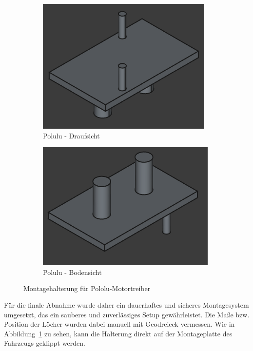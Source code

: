 \begin{figure}[h]
    \centering

    \begin{subfigure}[b]{0.25\textwidth}
        \centering
        \includegraphics[width=\textwidth]{images/cad_polulu_front.png}
        \caption{Polulu - Draufsicht}
    \end{subfigure}
    \hspace{0.05\textwidth}
    \begin{subfigure}[b]{0.25\textwidth}
        \centering
        \includegraphics[width=\textwidth]{images/cad_polulu_back.png}
        \caption{Polulu - Bodensicht}
    \end{subfigure}

    \caption{Montagehalterung für Pololu-Motortreiber}
    \label{fig:pololu_mounting}
\end{figure}

Für die finale Abnahme wurde daher ein dauerhaftes und sicheres Montagesystem umgesetzt, das ein sauberes und zuverlässiges Setup gewährleistet. Die Maße bzw. Position der Löcher wurden dabei manuell mit Geodreieck vermessen. Wie in Abbildung~\ref{fig:pololu_mounting} zu sehen, kann die Halterung direkt auf der Montageplatte des Fahrzeugs geklippt werden.